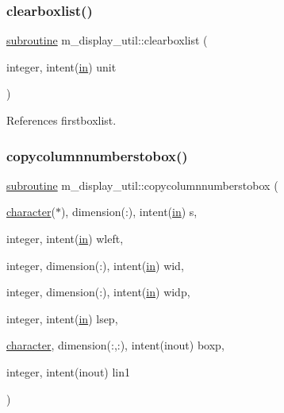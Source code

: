 \subsubsection{\texorpdfstring{clearboxlist()}{clearboxlist()}}
{\footnotesize\ttfamily \hyperlink{M__stopwatch_83_8txt_acfbcff50169d691ff02d4a123ed70482}{subroutine} m\+\_\+display\+\_\+util\+::clearboxlist (\begin{DoxyParamCaption}\item[{integer, intent(\hyperlink{M__journal_83_8txt_afce72651d1eed785a2132bee863b2f38}{in})}]{unit }\end{DoxyParamCaption})\hspace{0.3cm}{\ttfamily [private]}}



References firstboxlist.

\mbox{\label{namespacem__display__util_a43abab0fd2426042dc21b42e638210a8}} 
\subsubsection{\texorpdfstring{copycolumnnumberstobox()}{copycolumnnumberstobox()}}
{\footnotesize\ttfamily \hyperlink{M__stopwatch_83_8txt_acfbcff50169d691ff02d4a123ed70482}{subroutine} m\+\_\+display\+\_\+util\+::copycolumnnumberstobox (\begin{DoxyParamCaption}\item[{\hyperlink{option__stopwatch_83_8txt_abd4b21fbbd175834027b5224bfe97e66}{character}($\ast$), dimension(\+:), intent(\hyperlink{M__journal_83_8txt_afce72651d1eed785a2132bee863b2f38}{in})}]{s,  }\item[{integer, intent(\hyperlink{M__journal_83_8txt_afce72651d1eed785a2132bee863b2f38}{in})}]{wleft,  }\item[{integer, dimension(\+:), intent(\hyperlink{M__journal_83_8txt_afce72651d1eed785a2132bee863b2f38}{in})}]{wid,  }\item[{integer, dimension(\+:), intent(\hyperlink{M__journal_83_8txt_afce72651d1eed785a2132bee863b2f38}{in})}]{widp,  }\item[{integer, intent(\hyperlink{M__journal_83_8txt_afce72651d1eed785a2132bee863b2f38}{in})}]{lsep,  }\item[{\hyperlink{option__stopwatch_83_8txt_abd4b21fbbd175834027b5224bfe97e66}{character}, dimension(\+:,\+:), intent(inout)}]{boxp,  }\item[{integer, intent(inout)}]{lin1 }\end{DoxyParamCaption})\hspace{0.3cm}{\ttfamily [private]}}

